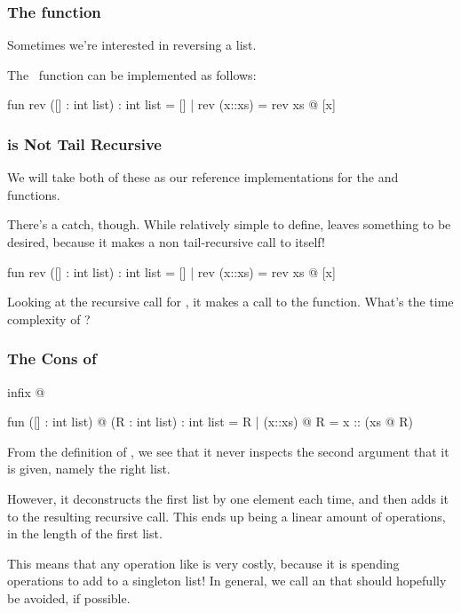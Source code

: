 \documentclass[aspectratio=169]{beamer}
\begin{document}
\begin{frame}[fragile]
  \frametitle{The  function}

  Sometimes we're interested in reversing a list.

  \vspace{\fill}

  The \footnotemark \, function can be implemented as follows:

  \begin{codeblock}
    fun rev ([] : int list) : int list = []
      | rev (x::xs) = rev xs @ [x] 
  \end{codeblock}

\end{frame}

\begin{frame}[fragile]
  \frametitle{ is Not Tail Recursive}

  We will take both of these as our reference implementations for the  and 
  functions.

  \vspace{\fill}

  There's a catch, though. While relatively simple to define,  leaves something to be
  desired, because it makes a non tail-recursive call to itself!

  \begin{codeblock}
    fun rev ([] : int list) : int list = []
      | rev (x::xs) = rev xs @ [x] 
  \end{codeblock}

  \vspace{\fill}

  Looking at the recursive call for , it makes a call to the  function. What's
  the time complexity of ?
\end{frame}

\begin{frame}[fragile]
  \frametitle{The Cons of }

  \begin{codeblock}
    infix @ 

    fun ([] : int list) @ (R : int list) : int list = R  
      | (x::xs) @ R = x :: (xs @ R) 
  \end{codeblock}

  From the definition of , we see that it never inspects the second argument that it
  is given, namely the right list.

  \vspace{\fill}

  However, it deconstructs the first list by one element each time, and then adds it to the
  resulting recursive call. This ends up being a linear amount of operations, in the length
  of the first list.

  \vspace{\fill}

  This means that any operation like  is very costly, because it is spending
   operations to add to a singleton list! In general, we call  an
   that should hopefully be avoided, if possible.
\end{frame}
\end{document}
